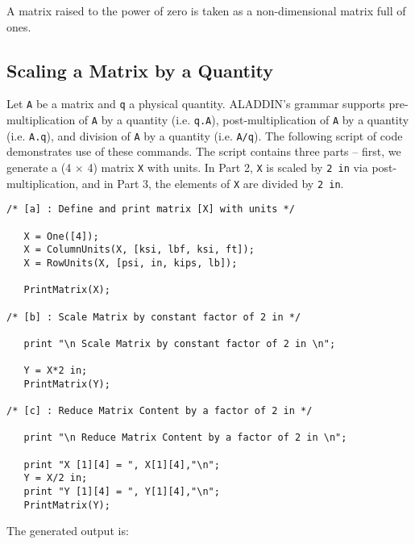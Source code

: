 \vspace{0.15 in}\noindent
A matrix raised to the power of zero is taken
as a non-dimensional matrix full of ones.

\subsection{Scaling a Matrix by a Quantity}

\vspace{0.15 in}
\noindent\hspace{0.50 in}
Let {\tt A} be a matrix and {\tt q} a physical quantity.
ALADDIN's grammar supports
pre-multiplication of {\tt A} by a quantity (i.e. {\tt q.A}),
post-multiplication of {\tt A} by a quantity (i.e. {\tt A.q}),
and division of {\tt A} by a quantity (i.e. {\tt A/q}).
The following script of code demonstrates use of these commands.
The script contains three parts -- first,
we generate a (4 $\times$ 4) matrix {\tt X} with units.
In Part 2, {\tt X} is scaled by {\tt 2 in} via post-multiplication,
and in Part 3, the elements of {\tt X} are divided by {\tt 2 in}.

\begin{footnotesize}
\begin{verbatim}
/* [a] : Define and print matrix [X] with units */

   X = One([4]);
   X = ColumnUnits(X, [ksi, lbf, ksi, ft]);
   X = RowUnits(X, [psi, in, kips, lb]);

   PrintMatrix(X);

/* [b] : Scale Matrix by constant factor of 2 in */

   print "\n Scale Matrix by constant factor of 2 in \n";

   Y = X*2 in;
   PrintMatrix(Y);

/* [c] : Reduce Matrix Content by a factor of 2 in */

   print "\n Reduce Matrix Content by a factor of 2 in \n";

   print "X [1][4] = ", X[1][4],"\n";
   Y = X/2 in;
   print "Y [1][4] = ", Y[1][4],"\n";
   PrintMatrix(Y);
\end{verbatim}
\end{footnotesize}

\vspace{0.05 in}\noindent
The generated output is:

